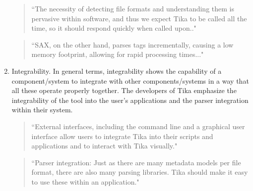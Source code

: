 \documentclass{article}
\begin{document}
\begin{enumerate}
    \begin{quote}
        ``The necessity of detecting file formats and understanding them is pervasive within software, and thus we expect Tika to be called all the time, so it should respond quickly when called upon.."
    \end{quote}
    
    \begin{quote}
        ``SAX, on the other hand, parses tags incrementally, causing a low memory footprint, allowing for rapid processing times..."     \end{quote}
    
    \item Integrability. In general terms, integrability shows the capability of a component/system to integrate with other components/systems in a way that all these operate properly together. The developers of Tika emphasize the integrability of the tool into the user's applications and the parser integration within their system. 
    
    \begin{quote}
        ``External interfaces, including the command line and a graphical user interface allow users to integrate Tika into their scripts and applications and to interact with Tika visually."
    \end{quote}
    
    \begin{quote}
        ``Parser integration: Just as there are many metadata models per file format, there are also many parsing libraries. Tika should make it easy to use these within an application."
    \end{quote}
    
\end{enumerate}
\end{document}
